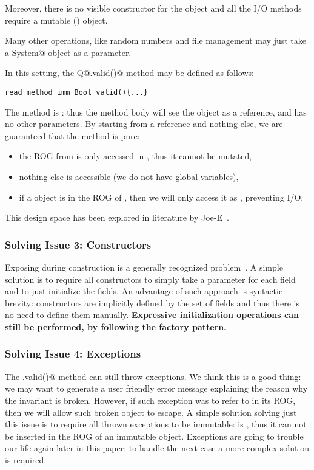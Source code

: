 Moreover, there is no visible constructor for the \Q@System@ object and all the I/O methods require a mutable (\Q@mut@) object.

Many other operations, like random numbers and file management may just take a \Q@mut System@ object as a parameter.

In this setting, the Q@.valid()@ method may be defined as follows:
\saveSpace
\begin{lstlisting}
read method imm Bool valid(){...}
\end{lstlisting}
\saveSpace
The method is \Q@read@: thus the method body will see the \Q@this@ object as a \Q@read@ reference, and has no other parameters.
By starting from a \Q@read@ reference and nothing else, we are guaranteed that the method is pure:
\begin{itemize}
\item the ROG from \Q@this@ is only accessed in \Q@read@, thus it cannot be mutated,
\item nothing else is accessible (we do not have global variables),
\item if a \Q@System@ object is in the ROG of \Q@this@, then we will only access it as \Q@read@, preventing I/O.
\end{itemize}
\noindent This design space has been explored in literature by Joe-E~\cite{finifter2008verifiable}.
\saveSpace

\subsubsection*{Solving Issue 3: Constructors}
\saveSpace
Exposing \Q@this@ during construction is a generally recognized problem~\cite{gil2009we}.
A simple solution is to require all constructors to 
simply take a parameter for each field and to just initialize the fields.
An advantage of such approach is syntactic brevity: constructors are implicitly defined
by the set of fields and thus there is no need to define them manually.
\textbf{Expressive initialization operations can still be performed, by following the factory pattern.}
\saveSpace
\subsubsection*{Solving Issue 4: Exceptions}
\saveSpace
The \Q@.valid()@ method can still throw exceptions.
We think this is a good thing: we may want to generate a user friendly error message explaining the reason why the invariant is broken.
However, if such exception was to refer to \Q@this@ in its ROG, then we will allow such broken object to escape.
A simple solution solving just this issue is to require all thrown exceptions to be immutable:
\Q@this@ is \Q@read@, thus it can not be inserted in the ROG of an immutable object.
Exceptions are going to trouble our life again later in this paper:
to handle the next case a more complex solution is required.




